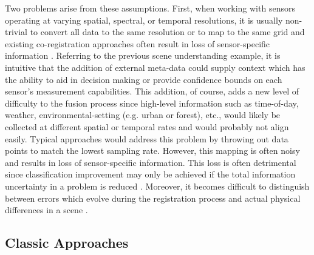 	Two problems arise from these assumptions.  First, when working with sensors operating at varying spatial, spectral, or temporal resolutions, it is usually non-trivial to convert all data to the same resolution or to map to the same grid and existing co-registration approaches often result in loss of sensor-specific information \cite{Shen2016SpatioTemporalSpectralFusion,Brigot2016CoregistrationForestRemoteSensingImages}.  Referring to the previous scene understanding example, it is intuitive that the addition of external meta-data could supply context which has the ability to aid in decision making or provide confidence bounds on each sensor's measurement capabilities.  This addition, of course, adds a new level of difficulty to the fusion process since high-level information such as time-of-day, weather, environmental-setting (e.g. urban or forest), etc., would likely be collected at different spatial or temporal rates and would probably not align easily.  Typical approaches would address this problem by throwing out data points to match the lowest sampling rate.  However, this mapping is often noisy and results in loss of sensor-specific information.  This loss is often detrimental since classification improvement may only be achieved if the total information uncertainty in a problem is reduced \cite{Ruta2000OverviewClassifierFusionMethods}.  Moreover, it becomes difficult to distinguish between errors which evolve during the registration process and actual physical differences in a scene \cite{Zitova2003SurveyImageRegistrationMethods}.
	\newline 
	
	\subsection{Classic Approaches}
	
%		
%		
%		
		
